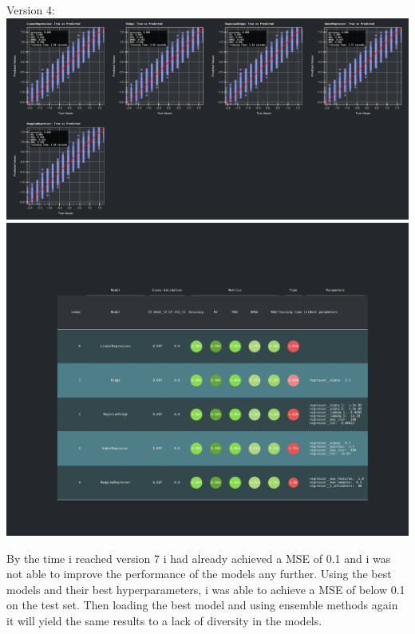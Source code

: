 \documentclass{assignment}
\begin{document}
\begin{center}
    Version 4:
    \includegraphics[width=6.5in]{../report/assets/ver4_best_models_result.pdf}    
    \includegraphics[width=6.5in]{../report/assets/ver4_best_models_result_table.pdf}
\end{center}
By the time i reached version 7 i had already achieved a MSE of 0.1 and i was not able to improve the performance of the models any further. 
Using the best models and their best hyperparameters, i was able to achieve a MSE of below 0.1 on the test set.
Then loading the best model and using ensemble methods again it will yield the same results to a lack of diversity in the models.
\end{document}
